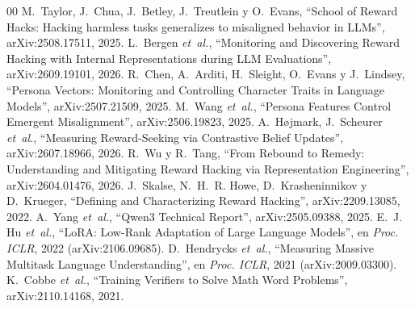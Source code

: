 \documentclass[conference,a4paper]{IEEEtran}
\begin{document}
\balance
\begin{thebibliography}{00}
 M.~Taylor, J.~Chua, J.~Betley, J.~Treutlein y O.~Evans,
``School of Reward Hacks: Hacking harmless tasks generalizes to misaligned
behavior in LLMs'', arXiv:2508.17511, 2025.
 L.~Bergen \textit{et~al.}, ``Monitoring and Discovering Reward
Hacking with Internal Representations during LLM Evaluations'',
arXiv:2609.19101, 2026.
 R.~Chen, A.~Arditi, H.~Sleight, O.~Evans y J.~Lindsey, ``Persona
Vectors: Monitoring and Controlling Character Traits in Language Models'',
arXiv:2507.21509, 2025.
 M.~Wang \textit{et~al.}, ``Persona Features Control Emergent
Misalignment'', arXiv:2506.19823, 2025.
 A.~Højmark, J.~Scheurer \textit{et~al.}, ``Measuring Reward-Seeking
via Contrastive Belief Updates'', arXiv:2607.18966, 2026.
 R.~Wu y R.~Tang, ``From Rebound to Remedy: Understanding and Mitigating
Reward Hacking via Representation Engineering'', arXiv:2604.01476, 2026.
 J.~Skalse, N.~H.~R. Howe, D.~Krasheninnikov y D.~Krueger, ``Defining
and Characterizing Reward Hacking'', arXiv:2209.13085, 2022.
 A.~Yang \textit{et~al.}, ``Qwen3 Technical Report'',
arXiv:2505.09388, 2025.
 E.~J. Hu \textit{et~al.}, ``LoRA: Low-Rank Adaptation of Large
Language Models'', en \textit{Proc. ICLR}, 2022 (arXiv:2106.09685).
 D.~Hendrycks \textit{et~al.}, ``Measuring Massive Multitask
Language Understanding'', en \textit{Proc. ICLR}, 2021 (arXiv:2009.03300).
 K.~Cobbe \textit{et~al.}, ``Training Verifiers to Solve Math Word
Problems'', arXiv:2110.14168, 2021.
\end{thebibliography}
\end{document}

